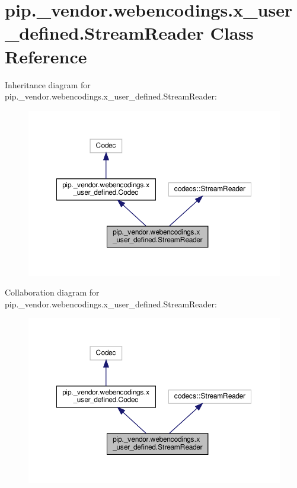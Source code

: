 \hypertarget{classpip_1_1__vendor_1_1webencodings_1_1x__user__defined_1_1StreamReader}{}\section{pip.\+\_\+vendor.\+webencodings.\+x\+\_\+user\+\_\+defined.\+Stream\+Reader Class Reference}
\label{classpip_1_1__vendor_1_1webencodings_1_1x__user__defined_1_1StreamReader}


Inheritance diagram for pip.\+\_\+vendor.\+webencodings.\+x\+\_\+user\+\_\+defined.\+Stream\+Reader\+:
\nopagebreak
\begin{figure}[H]
\begin{center}
\leavevmode
\includegraphics[width=350pt]{classpip_1_1__vendor_1_1webencodings_1_1x__user__defined_1_1StreamReader__inherit__graph}
\end{center}
\end{figure}


Collaboration diagram for pip.\+\_\+vendor.\+webencodings.\+x\+\_\+user\+\_\+defined.\+Stream\+Reader\+:
\nopagebreak
\begin{figure}[H]
\begin{center}
\leavevmode
\includegraphics[width=350pt]{classpip_1_1__vendor_1_1webencodings_1_1x__user__defined_1_1StreamReader__coll__graph}
\end{center}
\end{figure}
